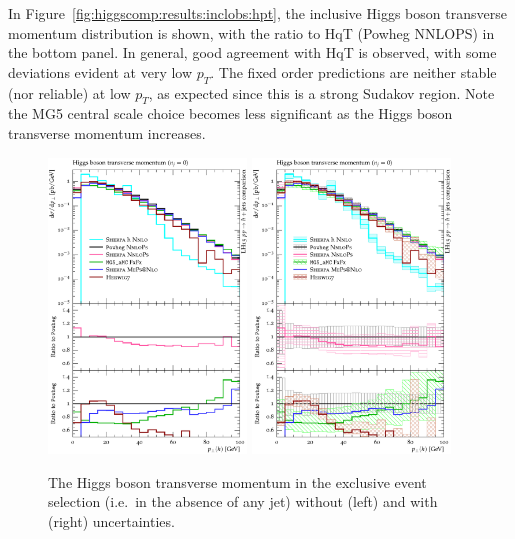 In Figure~\ref{fig:higgscomp:results:inclobs:hpt}, the inclusive Higgs
boson transverse momentum distribution is shown, with the ratio to HqT
(Powheg NNLOPS) in the bottom panel.  In general, good agreement with
HqT is observed, with some deviations evident at very low $p_T$.  The
fixed order predictions are neither stable (nor reliable) at low
$p_T$, as expected since this is a strong Sudakov region. Note the MG5
central scale choice becomes less significant as the Higgs boson
transverse momentum increases.

\begin{figure}[t!]
  \centering
  \includegraphics[width=0.47\textwidth]{figures/hjetscomp_u_H_pT_excl.pdf}
  \hfill
  \includegraphics[width=0.47\textwidth]{figures/hjetscomp_H_pT_excl.pdf}
  \caption{
    The Higgs boson transverse momentum in the exclusive event
    selection (i.e.~in the absence of any jet) without (left) and with
    (right) uncertainties.
    \label{fig:higgscomp:results:exclobs:hpt}
  }
\end{figure}

